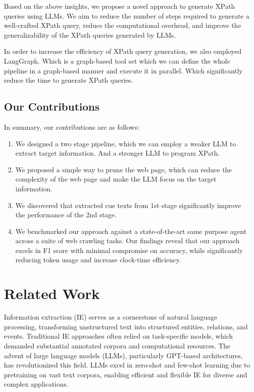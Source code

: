 \documentclass[a4paper]{article}
\begin{document}
Based on the above insights, we propose a novel approach to generate XPath queries using LLMs. We aim to reduce the number of steps required to generate a well-crafted XPath query, reduce the computational overhead, and improve the generalizability of the XPath queries generated by LLMs.

In order to increase the efficiency of XPath query generation, we also employed LangGraph. Which is a graph-based tool set which we can define the whole pipeline in a graph-based manner and execute it in parallel. Which significantly reduce the time to generate XPath queries.

\subsection{Our Contributions}

In summary, our contributions are as follows:

\begin{enumerate}
  \item We designed a two stage pipeline, which we can employ a weaker LLM to extract target information. And a stronger LLM to program XPath.
  \item We proposed a simple way to prune the web page, which can reduce the complexity of the web page and make the LLM focus on the target information.
  \item We discovered that extracted cue texts from 1st stage significantly improve the performance of the 2nd stage.
  \item We benchmarked our approach against a state-of-the-art same purpose agent across a suite of web crawling tasks. Our findings reveal that our approach excels in F1 score with minimal compromise on accuracy, while significantly reducing token usage and increase clock-time efficiency.
\end{enumerate}
\section{Related Work}
Information extraction (IE) serves as a cornerstone of natural language processing, transforming unstructured text into structured entities, relations, and events. Traditional IE approaches often relied on task-specific models, which demanded substantial annotated corpora and computational resources. The advent of large language models (LLMs), particularly GPT-based architectures, has revolutionized this field. LLMs excel in zero-shot and few-shot learning due to pretraining on vast text corpora, enabling efficient and flexible IE for diverse and complex applications.
\end{document}
